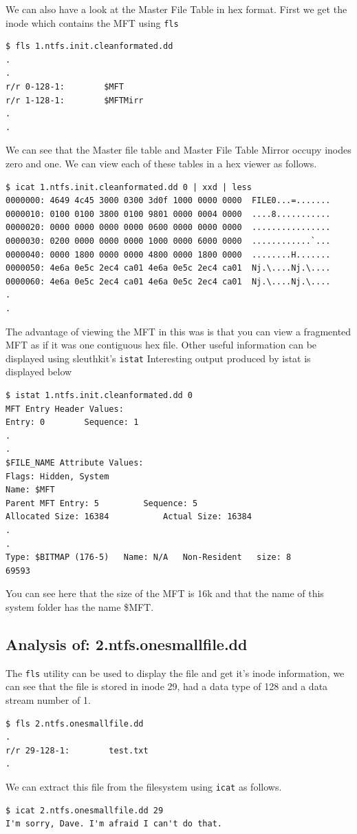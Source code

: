 \documentclass[a4paper,
    11pt,
    normalheadings,
    parindent,
    UKenglish,
    abstracton,
    ]{scrartcl}
\begin{document}
We can also have a look at the Master File Table in hex format. First we get the inode which contains the MFT using \texttt{fls}

\begin{verbatim}
$ fls 1.ntfs.init.cleanformated.dd
.
.
r/r 0-128-1:        $MFT
r/r 1-128-1:        $MFTMirr
.
.
\end{verbatim}
We can see that the Master file table and Master File Table Mirror occupy inodes zero and one. We can view each of these tables in a hex viewer as follows.
\begin{verbatim}
$ icat 1.ntfs.init.cleanformated.dd 0 | xxd | less
0000000: 4649 4c45 3000 0300 3d0f 1000 0000 0000  FILE0...=.......
0000010: 0100 0100 3800 0100 9801 0000 0004 0000  ....8...........
0000020: 0000 0000 0000 0000 0600 0000 0000 0000  ................
0000030: 0200 0000 0000 0000 1000 0000 6000 0000  ............`...
0000040: 0000 1800 0000 0000 4800 0000 1800 0000  ........H.......
0000050: 4e6a 0e5c 2ec4 ca01 4e6a 0e5c 2ec4 ca01  Nj.\....Nj.\....
0000060: 4e6a 0e5c 2ec4 ca01 4e6a 0e5c 2ec4 ca01  Nj.\....Nj.\....
.
.
\end{verbatim}
The advantage of viewing the MFT in this was is that you can view a fragmented MFT as if it was one contiguous hex file. Other useful information can be displayed using sleuthkit's \texttt{istat}
Interesting output produced by istat is displayed below
\begin{verbatim}
$ istat 1.ntfs.init.cleanformated.dd 0
MFT Entry Header Values:
Entry: 0        Sequence: 1
.
.
$FILE_NAME Attribute Values:
Flags: Hidden, System
Name: $MFT
Parent MFT Entry: 5         Sequence: 5
Allocated Size: 16384           Actual Size: 16384
.
.
Type: $BITMAP (176-5)   Name: N/A   Non-Resident   size: 8
69593
\end{verbatim}
You can see here that the size of the MFT is 16k and that the name of this system folder has the name \$MFT.

\subsection{Analysis of: 2.ntfs.onesmallfile.dd}
The \texttt{fls} utility can be used to display the file and get it's inode information, we can see that the file is stored in inode 29, had a data type of 128 and a data stream number of 1.

\begin{verbatim}
$ fls 2.ntfs.onesmallfile.dd
.
r/r 29-128-1:        test.txt
.
\end{verbatim}
We can extract this file from the filesystem using \texttt{icat} as follows.
\begin{verbatim}
$ icat 2.ntfs.onesmallfile.dd 29
I'm sorry, Dave. I'm afraid I can't do that.
\end{verbatim}
\end{document}
